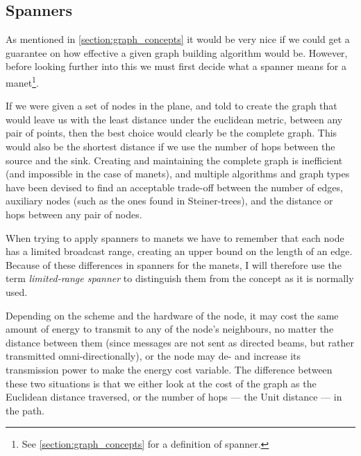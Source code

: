 
\subsection{Spanners}
\label{section:spanners}
As mentioned in \ref{section:graph_concepts} it would be very nice if we could get a guarantee on how effective a given graph building algorithm would be. However, before looking further into this we must first decide what a spanner means for a \ac{manet}\footnote{See \ref{section:graph_concepts} for a definition of spanner.}.

If we were given a set of nodes in the plane, and told to create the graph that would leave us with the least distance under the euclidean metric, between any pair of points, then the best choice would clearly be the complete graph. This would also be the shortest distance if we use the number of hops between the source and the sink. Creating and maintaining the complete graph is inefficient (and impossible in the case of \acp{manet}), and multiple algorithms and graph types have been devised to find an acceptable trade-off between the number of edges, auxiliary nodes (such as the ones found in Steiner-trees), and the distance or hops between any pair of nodes.

When trying to apply spanners to \acp{manet} we have to remember that each node has a limited broadcast range, creating an upper bound on the length of an edge. Because of these differences in spanners for the \acp{manet}, I will therefore use the term \emph{limited-range spanner} to distinguish them from the concept as it is normally used. 

Depending on the scheme and the hardware of the node, it may cost the same amount of energy to transmit to any of the node's neighbours, no matter the distance between them (since messages are not sent as directed beams, but rather transmitted omni-directionally), or the node may de- and increase its transmission power to make the energy cost variable. The difference between these two situations is that we either look at the cost of the graph as the Euclidean distance traversed, or the number of hops --- the Unit distance --- in the path. 

